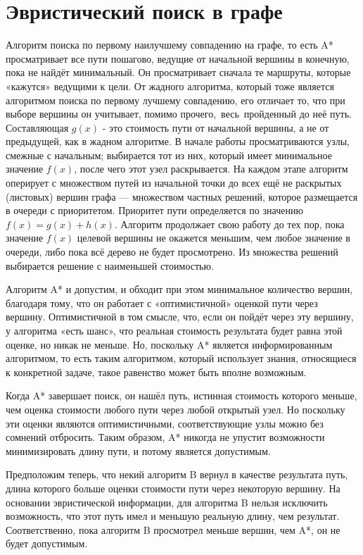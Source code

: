 \section{Эвристический поиск в графе}
Алгоритм поиска по первому наилучшему совпадению на графе, то есть A* просматривает все пути пошагово, ведущие от начальной вершины в конечную, пока не найдёт минимальный. Он просматривает сначала те маршруты, которые «кажутся» ведущими к цели. От жадного алгоритма, который тоже является алгоритмом поиска по первому лучшему совпадению, его отличает то, что при выборе вершины он учитывает, помимо прочего, весь пройденный до неё путь. Составляющая $g(x)$ - это стоимость пути от начальной вершины, а не от предыдущей, как в жадном алгоритме.
В начале работы просматриваются узлы, смежные с начальным; выбирается тот из них, который имеет минимальное значение $f(x)$, после чего этот узел раскрывается. На каждом этапе алгоритм оперирует с множеством путей из начальной точки до всех ещё не раскрытых (листовых) вершин графа — множеством частных решений, которое размещается в очереди с приоритетом. Приоритет пути определяется по значению $f(x) = g(x) + h(x)$. Алгоритм продолжает свою работу до тех пор, пока значение $f(x)$ целевой вершины не окажется меньшим, чем любое значение в очереди, либо пока всё дерево не будет просмотрено. Из множества решений выбирается решение с наименьшей стоимостью.

Алгоритм A* и допустим, и обходит при этом минимальное количество вершин, благодаря тому, что он работает с «оптимистичной» оценкой пути через вершину. Оптимистичной в том смысле, что, если он пойдёт через эту вершину, у алгоритма «есть шанс», что реальная стоимость результата будет равна этой оценке, но никак не меньше. Но, поскольку A* является информированным алгоритмом, то есть таким алгоритмом, который использует знания, относящиеся к конкретной задаче, такое равенство может быть вполне возможным.

Когда A* завершает поиск, он нашёл путь, истинная стоимость которого меньше, чем оценка стоимости любого пути через любой открытый узел. Но поскольку эти оценки являются оптимистичными, соответствующие узлы можно без сомнений отбросить. Таким образом, A* никогда не упустит возможности минимизировать длину пути, и потому является допустимым.

Предположим теперь, что некий алгоритм B вернул в качестве результата путь, длина которого больше оценки стоимости пути через некоторую вершину. На основании эвристической информации, для алгоритма B нельзя исключить возможность, что этот путь имел и меньшую реальную длину, чем результат. Соответственно, пока алгоритм B просмотрел меньше вершин, чем A*, он не будет допустимым. 
	
